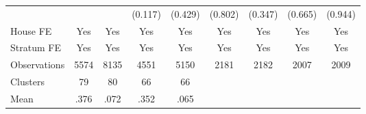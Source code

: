 {\begin{tabular}{l*{8}{c}}
                &                  &                  &  (0.117)         &  (0.429)         &  (0.802)         &  (0.347)         &  (0.665)         &  (0.944)         \\
House FE        &      Yes         &      Yes         &      Yes         &      Yes         &      Yes         &      Yes         &      Yes         &      Yes         \\
Stratum FE      &      Yes         &      Yes         &      Yes         &      Yes         &      Yes         &      Yes         &      Yes         &      Yes         \\
\midrule
Observations    &     5574         &     8135         &     4551         &     5150         &     2181         &     2182         &     2007         &     2009         \\
Clusters        &       79         &       80         &       66         &       66         &                  &                  &                  &                  \\
Mean            &     .376         &     .072         &     .352         &     .065         &                  &                  &                  &                  \\
\bottomrule
\end{tabular}
}
